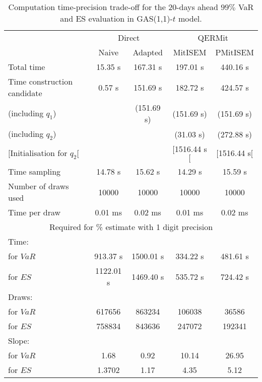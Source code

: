 { \renewcommand{\arraystretch}{1.3} 
\begin{table}[h] 
\centering 
\caption{Computation time-precision trade-off for the 20-days ahead  $99\%$ VaR and ES evaluation in GAS(1,1)-$t$ model.} 
\label{tab:time_precision_t_gas} 
\begin{tabular}{lcccc}  
  & \multicolumn{2}{c}{Direct} & \multicolumn{2}{c}{QERMit}  \\ \cline{2-5} 
  & Naive & Adapted & MitISEM & PMitISEM  \\ \hline 
Total time & 15.35 s & 167.31 s & 197.01 s & 440.16 s \\ 
Time construction candidate & 0.57 s & 151.69 s & 182.72 s & 424.57 s \\ 
 (including $q_{1}$) &   &  (151.69 s) & (151.69 s) & (151.69 s) \\ 
 (including $q_{2}$) &   &  & (31.03 s) & (272.88 s) \\ 
$[$Initialisation for $q_{2}$$[$&   &   & $[$1516.44 s$[$ & $[$1516.44 s$[$ \\ 
Time sampling & 14.78 s & 15.62 s & 14.29 s & 15.59 s  \\  
Number of draws used & 10000 & 10000 & 10000 & 10000 \\ 
Time per draw & 0.01 ms & 0.02 ms & 0.01 ms & 0.02 ms \\ \hline 
\multicolumn{5}{c}{Required for \% estimate with 1 digit precision} \\ \hline 
Time: &  &  &   &  \\ 
\hspace{1cm} for $VaR$ & 913.37 s & 1500.01 s & 334.22 s & 481.61 s \\ 
\hspace{1cm} for $ES$ & 1122.01 s & 1469.40 s & 535.72 s & 724.42 s \\ 
Draws: &  &  &   &  \\ 
\hspace{1cm} for $VaR$ & 617656 & 863234  & 106038  &  36586  \\ 
\hspace{1cm} for $ES$ & 758834 & 843636  & 247072   & 192341  \\ 
\hline 
Slope: &  &  &   &  \\ 
\hspace{1cm} for $VaR$ & 1.68 & 0.92  & 10.14  & 26.95  \\ 
\hspace{1cm} for $ES$ & 1.3702 & 1.17  & 4.35   & 5.12  \\  \hline 
\end{tabular} 
\end{table} 
} 
